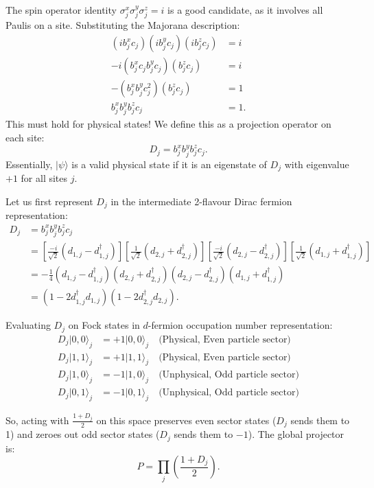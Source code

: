 \documentclass[11pt,a4paper]{article}
\begin{document}
The spin operator identity $\sigma_j^x \sigma_j^y \sigma_j^z = i$ is a good candidate, as it involves all Paulis on a site.
Substituting the Majorana description:
\begin{align}
    (i b_j^x c_j)(i b_j^y c_j)(i b_j^z c_j) &= i \nonumber \\
    -i (b_j^x c_j b_j^y c_j)(b_j^z c_j) &= i \nonumber \\
    -(b_j^x b_j^y c_j^2)(b_j^z c_j) &= 1 \nonumber \\
    b_j^x b_j^y b_j^z c_j &= 1.
\end{align}
This must hold for physical states! We define this as a projection operator on each site:
\begin{equation}
    D_j = b_j^x b_j^y b_j^z c_j.
\end{equation}
Essentially, $|\psi\rangle$ is a valid physical state if it is an eigenstate of $D_j$ with eigenvalue $+1$ for all sites $j$.

Let us first represent $D_j$ in the intermediate 2-flavour Dirac fermion representation:
\begin{align}
    D_j &= b_j^x b_j^y b_j^z c_j \nonumber \\
    &= \left[\frac{-i}{\sqrt{2}}(d_{1,j}-d_{1,j}^\dagger)\right] \left[\frac{1}{\sqrt{2}}(d_{2,j}+d_{2,j}^\dagger)\right] \left[\frac{-i}{\sqrt{2}}(d_{2,j}-d_{2,j}^\dagger)\right] \left[\frac{1}{\sqrt{2}}(d_{1,j}+d_{1,j}^\dagger)\right] \nonumber \\
    &= -\frac{1}{4} (d_{1,j}-d_{1,j}^\dagger)(d_{2,j}+d_{2,j}^\dagger)(d_{2,j}-d_{2,j}^\dagger)(d_{1,j}+d_{1,j}^\dagger) \nonumber \\
    &= (1 - 2d_{1,j}^\dagger d_{1,j})(1 - 2d_{2,j}^\dagger d_{2,j}).
\end{align}

Evaluating $D_j$ on Fock states in $d$-fermion occupation number representation:
\begin{align}
    D_j |0,0\rangle_j &= +1 |0,0\rangle_j \quad \text{(Physical, Even particle sector)} \\
    D_j |1,1\rangle_j &= +1 |1,1\rangle_j \quad \text{(Physical, Even particle sector)} \\
    D_j |1,0\rangle_j &= -1 |1,0\rangle_j \quad \text{(Unphysical, Odd particle sector)} \\
    D_j |0,1\rangle_j &= -1 |0,1\rangle_j \quad \text{(Unphysical, Odd particle sector)}
\end{align}

So, acting with $\frac{1+D_j}{2}$ on this space preserves even sector states ($D_j$ sends them to 1) and zeroes out odd sector states ($D_j$ sends them to $-1$).
The global projector is:
\begin{equation}
    P = \prod_{j} \left( \frac{1 + D_j}{2} \right).
\end{equation}
\end{document}
